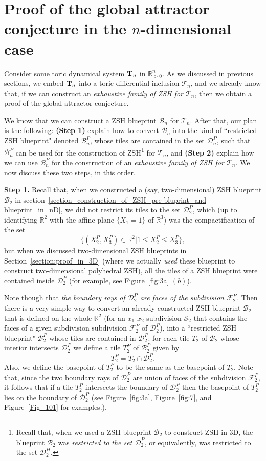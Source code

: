\documentclass[12pt,letterpaper]{article}
\renewcommand{\S}{\mathcal{S}}
\newcommand{\T}{\mathcal{T}}
\newcommand{\B}{\mathcal{B}}
\newcommand{\D}{\mathcal{D}}
\newcommand{\F}{\mathcal{F}}
\newcommand{\RR}{\mathbb{R}}
\newcommand{\RRpn}{\mathbb{R}_{>0}^n}
\begin{document}
\newpage 

\section{Proof of the global attractor conjecture in the $n$-dimensional case}

Consider some toric dynamical system ${\bf T}_n$ in $\RRpn$. 
As we discussed in previous sections, we embed ${\bf T}_n$ into a toric differential inclusion $\T_n$, and we already know that, if we can construct an \ul{\em exhaustive family of ZSH for $\T_n$}, then we obtain a proof of the global attractor conjecture. 

\medskip


We know that we can construct a ZSH blueprint $\B_n$ for $\T_n$. After that, our plan is the following:  {\bf (Step 1)} explain how to convert $\B_n$ into the kind of ``restricted ZSH blueprint" denoted  $\B_n^P$, whose tiles are contained in the set $\D_n^P$, such that $\B_n^P$  can be used for the  construction of ZSH\footnote{Recall that, when we used a ZSH blueprint $\B_2$ to construct ZSH in 3D, the blueprint $\B_2$ was {\em restricted to the set $\D_2^P$}, or equivalently, was restricted to the set $\D_2^H$.} for $\T_n$, and {\bf (Step 2)} explain how we can use $\B_n^P$  for the construction of an {\em exhaustive family of ZSH for $\T_n$}. We now discuss these two steps,  in this  order.

\bigskip 
\bigskip 

\noindent
{\bf Step 1.}  Recall that, when we constructed a (say, two-dimensional) ZSH blueprint $\B_2$ in section~\ref{section_construction_of_ZSH_pre-bluprint_and blueprint_in_nD}, we did not restrict its tiles to the set $\D_2^P$, which (up to identifying $\RR^2$ with the affine plane $\{ X_1 =1 \}$ of $\RR^3$) was the compactification of the set 
$$
\{ (X_2^P, X_3^P) \in \RR^2 |  1 \le X_2^P \le X_3^P \},
$$
but when we discussed two-dimensional ZSH blueprints in Section~\ref{section:proof_in_3D} (where we actually {\em used} these blueprint to construct two-dimensional polyhedral ZSH), all the tiles of a ZSH blueprint were contained inside $\D_2^P$ (for example, see Figure~\ref{fig:3a} $(b)$).

Note though that {\em the boundary rays of $\D_2^P$ are faces of the subdivision $\F_2^P$.}  Then there is a very simple way to convert an already constructed ZSH blueprint $\B_2$ that is defined on the whole $\RR^2$ (for an $x_1$-$x_2$-subdivision $\S_2$ that contains the faces of a given subdivision subdivision $\F_2^P$ of $\D_2^P$), into a ``restricted ZSH blueprint" $\B_2^P$ whose tiles are contained in $\D_2^P$: for each tile $T_2$ of $\B_2$ whose interior intersects $\D_2^P$ we define a tile $T_2^P$ of $\B_2^P$ given by
$$
T_2^P = T_2 \cap \D_2^P.
$$
Also, we define the basepoint of $T_2^P$ to be the same as the basepoint of $T_2$. 
Note that, since the two boundary rays of $\D_2^P$ are union of faces of the subdivision $\F_2^P$, it follows that if a tile $T_2^P$ intersects the boundary of $\D_2^P$ then the basepoint of $T_2^P$ lies on the boundary of $\D_2^P$ (see Figure~\ref{fig:3a}, Figure~\ref{fig:7}, and Figure~\ref{Fig_101} for examples.). 
\end{document}
